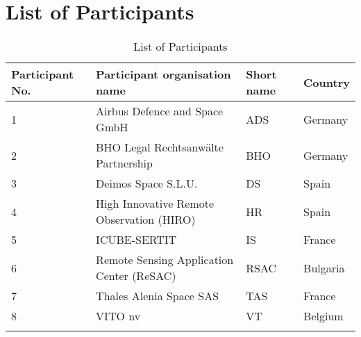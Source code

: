 \chapter{List of Participants}

\begin{longtable}[H]{l p{8cm} p{1cm} p{2cm}}
	
	\toprule[2pt]
	
	\textbf{Participant No.} & \textbf{Participant organisation name} & \textbf{Short name} & \textbf{Country} \\
	
	\midrule[1.5pt] 
	\endhead
	
	1 & Airbus Defence and Space GmbH & ADS & Germany \vspace{0.2cm} \\
	
	\midrule

	2 & BHO Legal Rechtsanwälte Partnership & BHO & Germany \vspace{0.2cm} \\
	
	\midrule
	
	3 &  Deimos Space S.L.U. & DS & Spain \vspace{0.2cm} \\

	\midrule

 	4 & High Innovative Remote Observation (HIRO) & HR & Spain \vspace{0.2cm} \\
 	
 	\midrule
 	
 	5 & ICUBE-SERTIT & IS & France \vspace{0.2cm} \\
 	
 	\midrule
 	
 	6 & Remote Sensing Application Center (ReSAC) & RSAC & Bulgaria \vspace{0.2cm} \\
 	
 	\midrule
 	
 	7 & Thales Alenia Space SAS & TAS & France \vspace{0.2cm} \\
 	
 	\midrule
 	
 	8 & VITO nv & VT & Belgium \vspace{0.2cm} \\
	
	\bottomrule[2pt]
	
	\caption{List of Participants}
	\label{Participants}
\end{longtable}